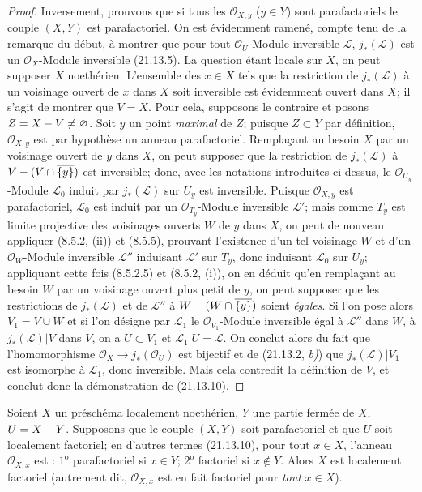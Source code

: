 \begin{proof}
Inversement, prouvons que si tous les $\mathcal O_{X,y}$ ($y\in Y$) sont
parafactoriels le couple $(X,Y)$ est parafactoriel. On est évidemment ramené, compte
tenu de la remarque du début, à montrer que pour tout $\mathcal O_U$-Module inversible
$\mathscr L$, $j_*(\mathscr L)$ est un $\mathcal O_X$-Module inversible (21.13.5).
La question étant locale sur $X$, on peut supposer $X$ noethérien. L'ensemble des
$x\in X$ tels que la restriction de $j_*(\mathscr L)$ à un voisinage ouvert de $x$
dans $X$ soit inversible est évidemment ouvert dans $X$; il s'agit de montrer que
$V=X$. Pour cela, supposons le contraire et posons $Z=X- V\neq\varnothing$. Soit $y$
un point \emph{maximal} de $Z$; puisque $Z\subset Y$ par définition,
$\mathcal O_{X,y}$ est par hypothèse un anneau parafactoriel. Remplaçant au besoin
$X$ par un voisinage ouvert de $y$ dans $X$, on peut supposer que la restriction de
$j_*(\mathscr L)$
à $V-(V\cap\overline{\{y\}})$ est inversible; donc, avec les notations introduites
ci-dessus, le $\mathcal O_{U_y}$-Module $\mathscr L_0$ induit par $j_*(\mathscr L)$
sur $U_y$ est inversible. Puisque $\mathcal O_{X,y}$ est parafactoriel,
$\mathscr L_0$ est induit par un $\mathcal O_{T_y}$-Module inversible $\mathscr L'$;
mais comme $T_y$ est limite projective des voisinages ouverts $W$ de $y$ dans $X$,
on peut de nouveau appliquer (8.5.2, (ii)) et (8.5.5), prouvant l'existence d'un tel
voisinage $W$ et d'un $\mathcal O_W$-Module inversible $\mathscr L''$ induisant
$\mathscr L'$ sur $T_y$, donc induisant $\mathscr L_0$ sur $U_y$; appliquant cette
fois (8.5.2.5) et (8.5.2, (i)), on en déduit qu'en remplaçant au besoin $W$ par un
voisinage ouvert plus petit de $y$, on peut supposer que les restrictions de
$j_*(\mathscr L)$ et de $\mathscr L''$ à
$W-(W\cap\overline{\{y\}})$ soient \emph{égales}. Si l'on pose alors $V_1=V\cup W$ et si
l'on désigne par $\mathscr L_1$ le $\mathcal O_{V_1}$-Module inversible égal à
$\mathscr L''$ dans $W$, à $j_*(\mathscr L)|V$ dans $V$, on a $U\subset V_1$ et
$\mathscr L_1|U=\mathscr L$. On conclut alors du fait que l'homomorphisme
$\mathcal O_X\to j_*(\mathcal O_U)$ est bijectif et de (21.13.2, \emph{b)}) que
$j_*(\mathscr L)|V_1$ est isomorphe à $\mathscr L_1$, donc inversible. Mais cela
contredit la définition de $V$, et conclut donc la démonstration de (21.13.10).
\end{proof}

\begin{corollary}[21.13.11]
\label{IV.21.13.11}
Soient $X$ un préschéma localement noethérien, $Y$ une partie fermée de $X$,
$U=X- Y$. Supposons que le couple $(X,Y)$ soit parafactoriel et que $U$ soit
localement factoriel; en d'autres termes \textup{(21.13.10)}, pour tout $x\in X$, l'anneau
$\mathcal O_{X,x}$ est : $1^{\mathrm o}$ parafactoriel si $x\in Y$;
$2^{\mathrm o}$ factoriel si $x\notin Y$. Alors $X$ est localement factoriel
\textup{(autrement dit, $\mathcal O_{X,x}$ est en fait factoriel pour \emph{tout} $x\in X$)}.
\end{corollary}

